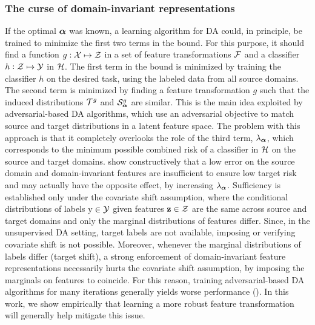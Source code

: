 \subsubsection{The curse of domain-invariant representations}
\label{sec:modafm_domain_invariance}
If the optimal ${\bm{\alpha}}$ was known, a learning algorithm for DA could, in principle, be trained to minimize the first two terms in the bound. For this purpose, it should find a function $g:{\mathcal{X}} \mapsto {\mathcal{Z}}$ in a set of feature transformations ${\mathcal{F}}$ and a classifier $h: {\mathcal{Z}} \mapsto {\mathcal{Y}}$ in ${\mathcal{H}}$. The first term in the bound is minimized by training the classifier $h$ on the desired task, using the labeled data from all source domains. The second term is minimized by finding a feature transformation $g$ such that the induced distributions ${\mathcal{T}}^g$ and ${\mathcal{S}}_{\bm{\alpha}}^g$ are similar. This is the main idea exploited by adversarial-based DA algorithms, which use an adversarial objective to match source and target distributions in a latent feature space. The problem with this approach is that it completely overlooks the role of the third term, $\lambda_{\bm{\alpha}}$, which corresponds to the minimum possible combined risk of a classifier in ${\mathcal{H}}$ on the source and target domains. \citet{Zhao2019} show constructively that a low error on the source domain and domain-invariant features are insufficient to ensure low target risk and may actually have the opposite effect, by increasing $\lambda_{\bm{\alpha}}$. Sufficiency is established only under the covariate shift assumption, where the conditional distributions of labels ${\textnormal{y}} \in {\mathcal{Y}}$ given features ${\mathbf{z}} \in {\mathcal{Z}}$ are the same across source and target domains and only the marginal distributions of features differ. Since, in the unsupervised DA setting, target labels are not available, imposing or verifying covariate shift is not possible. Moreover, whenever the marginal distributions of labels differ (target shift), a strong enforcement of domain-invariant feature representations necessarily hurts the covariate shift assumption, by imposing the marginals on features to coincide. For this reason, training adversarial-based DA algorithms for many iterations generally yields worse performance (\citet{Zhao2019}). In this work, we show empirically that learning a more robust feature transformation will generally help mitigate this issue.

